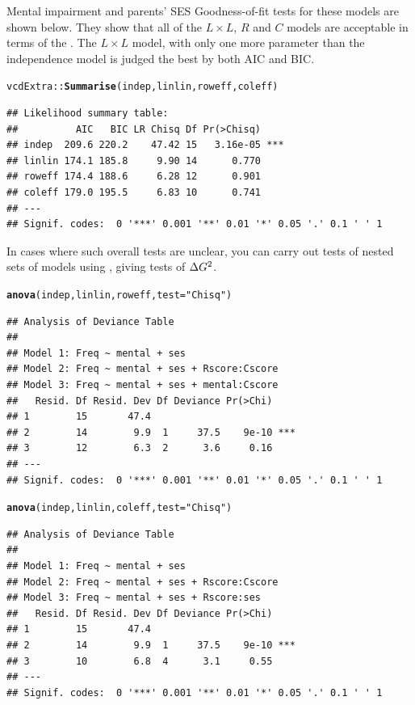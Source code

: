 \documentclass[11pt]{book}\usepackage[]{graphicx}\usepackage[]{color}
\makeatletter
\newcommand{\hlstr}[1]{\textcolor[rgb]{0.192,0.494,0.8}{#1}}%
\newcommand{\hlstd}[1]{\textcolor[rgb]{0.345,0.345,0.345}{#1}}%
\newcommand{\hlkwc}[1]{\textcolor[rgb]{0.333,0.667,0.333}{#1}}%
\newcommand{\hlkwd}[1]{\textcolor[rgb]{0.737,0.353,0.396}{\textbf{#1}}}%
\newenvironment{kframe}{%
 \def\at@end@of@kframe{}%
 \ifinner\ifhmode%
  \def\at@end@of@kframe{\end{minipage}}%
  \begin{minipage}{\columnwidth}%
 \fi\fi%
 \def\FrameCommand##1{\hskip\@totalleftmargin \hskip-\fboxsep
 \colorbox{shadecolor}{##1}\hskip-\fboxsep
     \hskip-\linewidth \hskip-\@totalleftmargin \hskip\columnwidth}%
 \MakeFramed {\advance\hsize-\width
   \@totalleftmargin\z@ \linewidth\hsize
   \@setminipage}}%
 {\par\unskip\endMakeFramed%
 \at@end@of@kframe}
\newenvironment{knitrout}{}{} %
\renewenvironment{knitrout}{\small\renewcommand{\baselinestretch}{.85}}{} %
\makeatother
\begin{document}
\begin{Example}[mental4]{Mental impairment and parents' SES}
Goodness-of-fit tests for these models are shown below. They show that all of the
$L \times L$, $R$ and $C$ models are acceptable in terms of the \LR \GSQ.
The $L \times L$ model, with only one more parameter than the independence model
is judged the best by both AIC and BIC.
\begin{knitrout}
\color{fgcolor}\begin{kframe}
\begin{alltt}
\hlstd{vcdExtra::}\hlkwd{Summarise}\hlstd{(indep, linlin, roweff, coleff)}
\end{alltt}
\begin{verbatim}
## Likelihood summary table:
##          AIC   BIC LR Chisq Df Pr(>Chisq)    
## indep  209.6 220.2    47.42 15   3.16e-05 ***
## linlin 174.1 185.8     9.90 14      0.770    
## roweff 174.4 188.6     6.28 12      0.901    
## coleff 179.0 195.5     6.83 10      0.741    
## ---
## Signif. codes:  0 '***' 0.001 '**' 0.01 '*' 0.05 '.' 0.1 ' ' 1
\end{verbatim}
\end{kframe}
\end{knitrout}

In cases where such overall tests are unclear, you can carry out tests of
nested sets of models using , giving tests of $\Delta G^2$.

\begin{knitrout}
\color{fgcolor}\begin{kframe}
\begin{alltt}
\hlkwd{anova}\hlstd{(indep, linlin, roweff,} \hlkwc{test}\hlstd{=}\hlstr{"Chisq"}\hlstd{)}
\end{alltt}
\begin{verbatim}
## Analysis of Deviance Table
## 
## Model 1: Freq ~ mental + ses
## Model 2: Freq ~ mental + ses + Rscore:Cscore
## Model 3: Freq ~ mental + ses + mental:Cscore
##   Resid. Df Resid. Dev Df Deviance Pr(>Chi)    
## 1        15       47.4                         
## 2        14        9.9  1     37.5    9e-10 ***
## 3        12        6.3  2      3.6     0.16    
## ---
## Signif. codes:  0 '***' 0.001 '**' 0.01 '*' 0.05 '.' 0.1 ' ' 1
\end{verbatim}
\begin{alltt}
\hlkwd{anova}\hlstd{(indep, linlin, coleff,} \hlkwc{test}\hlstd{=}\hlstr{"Chisq"}\hlstd{)}
\end{alltt}
\begin{verbatim}
## Analysis of Deviance Table
## 
## Model 1: Freq ~ mental + ses
## Model 2: Freq ~ mental + ses + Rscore:Cscore
## Model 3: Freq ~ mental + ses + Rscore:ses
##   Resid. Df Resid. Dev Df Deviance Pr(>Chi)    
## 1        15       47.4                         
## 2        14        9.9  1     37.5    9e-10 ***
## 3        10        6.8  4      3.1     0.55    
## ---
## Signif. codes:  0 '***' 0.001 '**' 0.01 '*' 0.05 '.' 0.1 ' ' 1
\end{verbatim}
\end{kframe}
\end{knitrout}


\end{Example}
\end{document}
